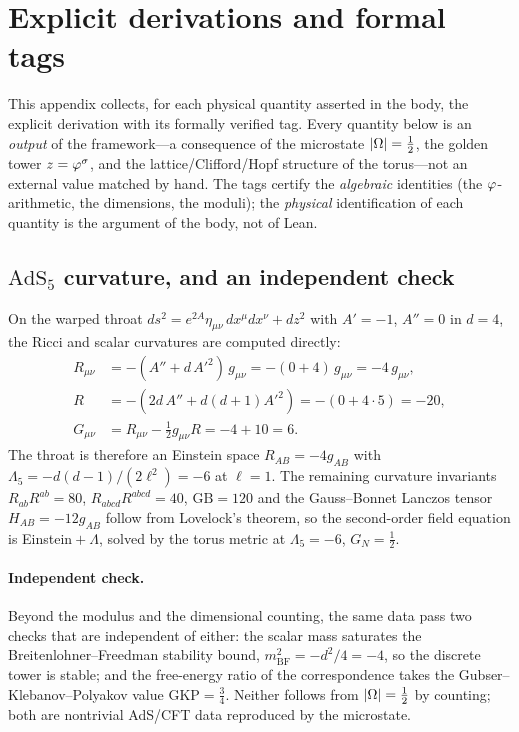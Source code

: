 \appendix
\section{Explicit derivations and formal tags}\label{app:derivations}
This appendix collects, for each physical quantity asserted in the body, the explicit derivation with its
formally verified tag. Every quantity below is an \emph{output} of the framework---a consequence of the
microstate $|\Omega|=\tfrac12$, the golden tower $z=\varphi^{\sigma}$, and the lattice/Clifford/Hopf structure of
the torus---not an external value matched by hand. The  tags certify the \emph{algebraic} identities (the
$\varphi$-arithmetic, the dimensions, the moduli); the \emph{physical} identification of each quantity is the
argument of the body, not of Lean.

\subsection{$\mathrm{AdS}_5$ curvature, and an independent check}\label{app:curvature}
On the warped throat $ds^2=e^{2A}\eta_{\mu\nu}\,dx^\mu dx^\nu+dz^2$ with $A'=-1$, $A''=0$ in $d=4$, the Ricci
and scalar curvatures are computed directly:
\begin{align}
  R_{\mu\nu}&=-(A''+d\,A'^2)\,g_{\mu\nu}=-(0+4)\,g_{\mu\nu}=-4\,g_{\mu\nu},\\
  R&=-(2d\,A''+d(d{+}1)A'^2)=-(0+4\cdot5)=-20,\\
  G_{\mu\nu}&=R_{\mu\nu}-\tfrac12 g_{\mu\nu}R=-4+10=6 .
\end{align}
The throat is therefore an Einstein space $R_{AB}=-4g_{AB}$ with $\Lambda_5=-d(d{-}1)/(2\ell^2)=-6$ at $\ell=1$.
The remaining curvature invariants $R_{ab}R^{ab}=80$, $R_{abcd}R^{abcd}=40$, $\mathrm{GB}=120$ and the
Gauss--Bonnet Lanczos tensor $H_{AB}=-12g_{AB}$ follow from Lovelock's theorem, so the second-order field
equation is Einstein${}+\Lambda$, solved by the torus metric at $\Lambda_5=-6$, $G_N=\tfrac12$.

\paragraph{Independent check.} Beyond the modulus and the dimensional counting, the same data pass two
checks that are independent of either: the scalar mass saturates the Breitenlohner--Freedman stability bound,
$m^2_{\mathrm{BF}}=-d^2/4=-4$, so the discrete tower is stable; and the free-energy ratio of the
correspondence takes the Gubser--Klebanov--Polyakov value $\mathrm{GKP}=\tfrac34$. Neither follows from
$|\Omega|=\tfrac12$ by counting; both are nontrivial AdS/CFT data reproduced by the microstate.

